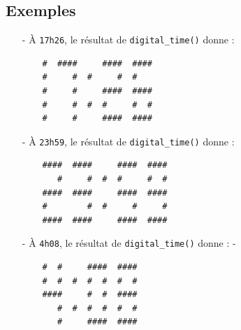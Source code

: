 \subsection*{Exemples}
\begin{itemize}
	\item[-] À \texttt{17h26}, le résultat de \texttt{digital\_time()} donne :
	\begin{verbatim}
	#  ####     ####  ####
	#     #  #     #  #  
	#     #     ####  ####
	#     #  #  #     #  #
	#     #     ####  ####
	\end{verbatim}
	\medskip
	
	\item[-] À \texttt{23h59}, le résultat de \texttt{digital\_time()} donne :
	\begin{verbatim}
	####  ####     ####  ####
	   #     #  #  #     #  #
	####  ####     ####  ####
	#        #  #     #     #
	####  ####     ####  ####
	\end{verbatim}
	\medskip
	
	\item[-] À \texttt{4h08}, le résultat de \texttt{digital\_time()} donne :
-	\begin{verbatim}
	#  #     ####  ####
	#  #  #  #  #  #  #
	####     #  #  ####
	   #  #  #  #  #  #
	   #     ####  ####
	\end{verbatim}
\end{itemize}
\medskip

